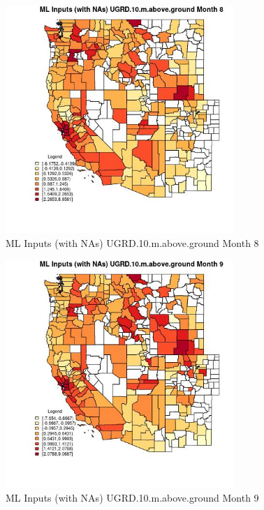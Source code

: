 \begin{figure} 
\centering  
\includegraphics[width=0.77\textwidth]{Code_Outputs/Report_ML_input_PM25_Step4_part_f_de_duplicated_aveswNAs_CountyUGRD10mabovegroundmedianMonth8.jpg} 
\caption{\label{fig:Report_ML_input_PM25_Step4_part_f_de_duplicated_aveswNAsCountyUGRD10mabovegroundmedianMonth8}ML Inputs (with NAs) UGRD.10.m.above.ground Month 8} 
\end{figure} 
 

\begin{figure} 
\centering  
\includegraphics[width=0.77\textwidth]{Code_Outputs/Report_ML_input_PM25_Step4_part_f_de_duplicated_aveswNAs_CountyUGRD10mabovegroundmedianMonth9.jpg} 
\caption{\label{fig:Report_ML_input_PM25_Step4_part_f_de_duplicated_aveswNAsCountyUGRD10mabovegroundmedianMonth9}ML Inputs (with NAs) UGRD.10.m.above.ground Month 9} 
\end{figure} 
 

